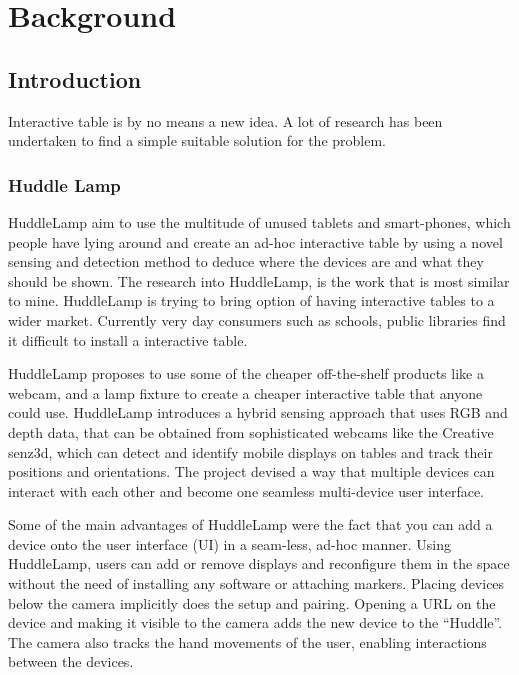 
\chapter{Background}

\label{ch:background}

\section{Introduction}

Interactive table is by no means a new idea. A lot of research has
been undertaken to find a simple suitable solution for the problem.

\subsection{Huddle Lamp}

HuddleLamp aim to use the multitude of unused tablets and smart-phones,
which people have lying around and create an ad-hoc interactive table
by using a novel sensing and detection method to deduce where the
devices are and what they should be shown. The research into HuddleLamp\cite{huddle-link}, is the work that
is most similar to mine. HuddleLamp is trying to bring option of having interactive tables to a wider market. Currently very day consumers such as schools, public libraries find it difficult to install a interactive table.


HuddleLamp\cite{huddelamp-paper} proposes to use some of the cheaper
off-the-shelf products like a webcam, and a lamp fixture to create a cheaper
interactive table that anyone could use. HuddleLamp\cite{huddelamp-paper} introduces a hybrid sensing approach that uses RGB and depth data, that can be
obtained from sophisticated webcams like the Creative senz3d\cite{creative-senz3d}, which can detect and identify
mobile displays on tables and track their positions and orientations. The project devised a way that multiple devices can interact with
each other and become one seamless multi-device
user interface.

Some of the main advantages of HuddleLamp were the fact that you can add a device onto the user interface (UI) in a seam-less, ad-hoc manner. Using HuddleLamp,
users can add or remove displays and reconfigure them in the space without
the need of installing any software or attaching markers. Placing
devices below the camera implicitly does the setup and pairing.
Opening a URL on the device and making it visible to the camera adds
the new device to the \textquotedblleft Huddle\textquotedblright .
The camera also tracks the hand movements of the user, enabling interactions
between the devices.

